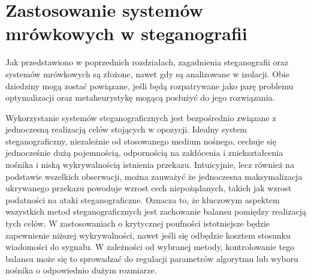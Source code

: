 \chapter{Zastosowanie systemów mrówkowych w steganografii}\label{chap:stegoants}
{

    Jak przedstawiono w poprzednich rozdziałach, zagadnienia steganografii oraz systemów mrówkowych są złożone, nawet
    gdy są analizowane w izolacji. Obie dziedziny mogą zostać powiązane, jeśli będą rozpatrywane jako parę problemu
    optymalizacji oraz metaheurystykę mogącą posłużyć do jego rozwiązania.

    Wykorzystanie systemów steganograficznych jest bezpośrednio związane z jednoczesną realizacją celów stojących w
    opozycji. Idealny system steganograficzny, niezależnie od stosowanego medium nośnego, cechuje się jednocześnie dużą
    pojemnością, odpornością na zakłócenia i zniekształcenia nośnika i niską wykrywalnością istnienia przekazu.
    Intuicyjnie, lecz również na podstawie wszelkich obserwacji, można zauważyć że jednoczesna maksymalizacja ukrywanego
    przekazu powoduje wzrost cech niepożądanych, takich jak wzrost podatności na ataki steganograficzne. Oznacza to, że
    kluczowym aspektem wszystkich metod steganograficznych jest zachowanie balansu pomiędzy realizacją tych celów. W
    zastosowaniach o krytycznej poufności istotniejsze będzie zapewnienie niższej wykrywalności, nawet jeśli się
    odbędzie kosztem stosunku wiadomości do sygnału. W zależności od wybranej metody, kontrolowanie tego balansu może
    się to sprowadzać do regulacji parametrów algorytmu lub wyboru nośnika o odpowiednio dużym rozmiarze.

}
